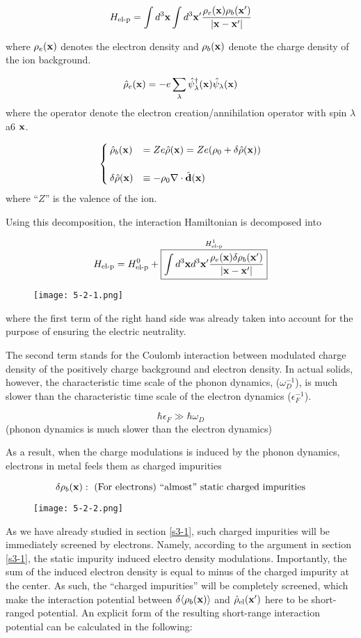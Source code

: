 \[H_{\text{el-p}}=\int d^3{\bf x}\int d^3{\bf x'}\frac{\rho_e({\bf x})\rho_b({\bf x'})}{|\bf x-x'|} \]

where $\rho_e({\bf x})$ denotes the electron density and $\rho_b({\bf x})$ denote the charge density of the ion background.

\[\hat{\rho}_e({\bf x}) = -e\sum_\lambda\hat{\psi}_\lambda^\dagger({\bf x})\hat{\psi}_\lambda({\bf x}) \]
where the operator denote the electron creation/annihilation operator with spin $\lambda$ a6 $\bf x$.

\[\begin{cases}
\hat{\rho}_b({\bf x}) &= Ze\hat{\rho}({\bf x}) = Ze(\rho_0+\delta\hat{\rho}({\bf x}))\\
&\\
\delta\hat{\rho}({\bf x}) &\equiv-\rho_0\nabla\cdot\hat{\bf d}({\bf x})
\end{cases}\]
where ``$Z$'' is the valence of the ion.

Using this decomposition, the interaction Hamiltonian is decomposed into

\[H_{\text{el-p}} = H_{\text{el-p}}^0 + \overset{H_{\text{el-p}}^1}{\fbox{$\displaystyle\int d^3{\bf x}d^3{\bf x'}\displaystyle\frac{\rho_e({\bf x})\delta\rho_b({\bf x'})}{|\bf x-x'|}$}} \]
\begin{wrapfigure}{r}{6cm}
\texttt{[image: 5-2-1.png]}
\end{wrapfigure}
where the first term of the right hand side was already taken into account for the purpose of ensuring the electric neutrality.

The second term stands for the Coulomb interaction between modulated charge density of the positively charge background and electron density. In actual solids, however, the characteristic time scale of the phonon dynamics, ($\omega_D^{-1}$), is much slower than the characteristic time scale of the electron dynamics ($\epsilon_F^{-1}$).

\[\hbar\epsilon_F\gg\hbar\omega_D \]
(phonon dynamics is much slower than the electron dynamics)

As a result, when the charge modulations is induced by the phonon dynamics, electrons in metal feels them as  charged impurities

\[\delta\rho_b({\bf x}):\text{ (For electrons) ``almost'' static charged impurities} \]
\begin{wrapfigure}{r}{6cm}
\texttt{[image: 5-2-2.png]}
\end{wrapfigure}
As we have already studied in section \ref{s3-1}, such charged impurities will be immediately screened by electrons. Namely, according to the argument in section \ref{s3-1}, the static impurity induced electro density modulations. Importantly, the sum of the induced electron density is equal to minus of the charged impurity at the center. As such, the ``charged impurities'' will be completely screened, which make the interaction potential between $\delta\langle\rho_b(\bf x)\rangle$ and $\hat{\rho}_{\text{el}}(\bf x')$ here to be short-ranged potential. An explicit form of the resulting short-range interaction potential can be calculated in the following:

